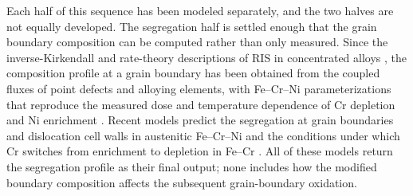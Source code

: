 \documentclass[12pt]{article}
\begin{document}
Each half of this sequence has been modeled separately, and the two
halves are not equally developed. The segregation half is settled enough
that the grain boundary composition can be computed rather than only measured.
Since the inverse-Kirkendall and rate-theory descriptions of RIS in
concentrated alloys \parencite{marwick1978segregation,wiedersich1979theory},
the composition profile at a grain boundary has been obtained from the
coupled fluxes of point defects and alloying elements, with Fe--Cr--Ni
parameterizations that reproduce the measured dose and temperature
dependence of Cr depletion and Ni enrichment
\parencite{allen1998modeling}. Recent models predict the
segregation at grain boundaries and dislocation cell walls in austenitic
Fe--Cr--Ni \parencite{kadambi2025phasefield} and the conditions under which
Cr switches from enrichment to depletion in Fe--Cr
\parencite{oplinger2026radiationinduceda}. All of these models return the segregation profile as their final output;
none includes how the modified boundary composition affects the subsequent
grain-boundary oxidation.
\end{document}
